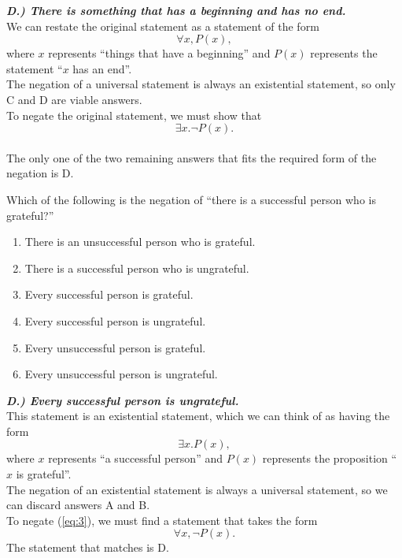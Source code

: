\documentclass{article}
\renewcommand{\(}{\left(}
\renewcommand{\)}{\right)}
\renewcommand{\emph}[1]{\textit{\textbf{#1}}}
\theoremstyle{plain}
\theoremstyle{plain}
\theoremstyle{definition}
\begin{document}
\begin{shaded}
\emph{D.) There is something that has a beginning and has no end.} \\
We can restate the original statement as a statement of the form
\begin{equation}
\forall x, P(x),
\end{equation} 
where $x$ represents ``things that have a beginning'' and $P(x)$ represents the statement ``$x$ has an end''. \\
The negation of a universal statement is always an existential statement, so only C and D are viable answers. \\
To negate the original statement, we must show that \begin{equation}
\exists x. \neg P(x).
\end{equation} \\
The only one of the two remaining answers that fits the required form of the negation is D.

\end{shaded}

Which of the following is the negation of ``there is a successful person who is grateful?''

\begin{enumerate}[label=\Alph*)]
    \item There is an unsuccessful person who is grateful.
    \item There is a successful person who is ungrateful.
    \item Every successful person is grateful.
    \item Every successful person is ungrateful.
    \item Every unsuccessful person is grateful.
    \item Every unsuccessful person is ungrateful.
\end{enumerate}

\begin{shaded}
\emph{D.) Every successful person is ungrateful.} \\

This statement is an existential statement, which we can think of as having the form 
\begin{equation} \label{eq:3}
\exists x. P(x),
\end{equation}
where $x$ represents ``a successful person'' and $P(x)$ represents the proposition ``$x$  is grateful''. \\
The negation of an existential statement is always a universal statement, so we can discard answers A and B. \\
To negate (\ref{eq:3}), we must find a statement that takes the form
\begin{equation}
\forall x, \neg P(x).
\end{equation}
The statement that matches is D.
\end{shaded}
\end{document}
